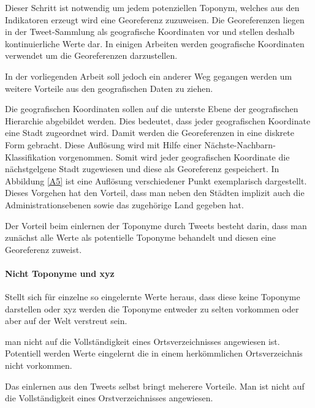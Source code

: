 				Dieser Schritt ist notwendig um jedem potenziellen Toponym, welches aus den Indikatoren erzeugt wird eine Georeferenz zuzuweisen. 
				Die Georeferenzen liegen in der Tweet-Sammlung als geografische Koordinaten vor und stellen deshalb kontinuierliche Werte dar.
				In einigen Arbeiten werden geografische Koordinaten verwendet um die Georeferenzen darzustellen. 

				In der vorliegenden Arbeit soll jedoch ein anderer Weg gegangen werden um weitere Vorteile aus den geografischen Daten zu ziehen.

				Die geografischen Koordinaten sollen auf die unterste Ebene der geografischen Hierarchie abgebildet werden. 
				Dies bedeutet, dass jeder geografischen Koordinate eine Stadt zugeordnet wird.
				Damit werden die Georeferenzen in eine diskrete Form gebracht.  
				Diese Auflösung wird mit Hilfe einer Nächste-Nachbarn-Klassifikation vorgenommen.
				Somit wird jeder geografischen Koordinate die nächstgelgene Stadt zugewiesen und diese als Georeferenz gespeichert. 
				In Abbildung \ref{A5} ist eine Auflösung verschiedener Punkt exemplarisch dargestellt. 
				Dieses Vorgehen hat den Vorteil, dass man neben den Städten implizit auch die Administrationsebenen sowie das zugehörige Land gegeben hat.













				Der Vorteil beim einlernen der Toponyme durch Tweets besteht darin, dass man zunächst alle Werte als potentielle Toponyme behandelt und diesen eine Georeferenz zuweist.

				\paragraph{Nicht Toponyme und xyz} 
				Stellt sich für einzelne so eingelernte Werte heraus, dass diese keine Toponyme darstellen oder xyz werden die Toponyme entweder zu selten vorkommen oder aber auf der Welt verstreut sein.   

				man nicht auf die Vollständigkeit eines Ortsverzeichnisses angewiesen ist.
				Potentiell werden Werte eingelernt die in einem herkömmlichen Ortsverzeichnis nicht vorkommen.   

				Das einlernen aus den Tweets selbst bringt meherere Vorteile. 
				Man ist nicht auf die Vollständigkeit eines Orstverzeichnisses angewiesen.
				
